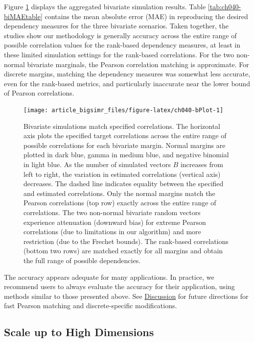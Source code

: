 \documentclass[]{article}
\begin{document}
Figure \ref{fig:ch040-bPlot} displays the aggregated bivariate simulation results.
Table \ref{tab:ch040-biMAEtable} contains the mean absolute error (MAE) in reproducing the desired dependency measures for the three bivariate scenarios.
Taken together, the studies show our methodology is generally accuracy across the entire range of possible correlation values for the rank-based dependency measures, at least in these limited simulation settings for the rank-based correlations.
For the two non-normal bivariate marginals, the Pearson correlation matching is approximate.
For discrete margins, matching the dependency measures was somewhat less accurate, even for the rank-based metrics, and particularly inaccurate near the lower bound of Pearson correlations.

\begin{figure}

{\centering \texttt{[image: article\_bigsimr\_files/figure-latex/ch040-bPlot-1]} 

}

\caption{Bivariate simulations match specified correlations. The horizontal axis plots the specified target correlations across the entire range of possible correlations for each bivariate margin. Normal margins are plotted in dark blue, gamma in medium blue, and negative binomial in light blue. As the number of simulated vectors $B$ increases from left to right, the variation in estimated correlations (vertical axis) decreases. The dashed line indicates equality between the specified and estimated correlations. Only the normal margins match the Pearson correlations (top row) exactly across the entire range of correlations. The two non-normal bivariate random vectors experience attenuation (downward bias) for extreme Pearson correlations (due to limitations in our algorithm) and more restriction (due to the Frechet bounds). The rank-based correlations (bottom two rows) are matched exactly for all margins and obtain the full range of possible dependencies.}\label{fig:ch040-bPlot}
\end{figure}

The accuracy appears adequate for many applications.
In practice, we recommend users to always evaluate the accuracy for their application, using methods similar to those presented above.
See \href{discussion}{Discussion} for future directions for fast Pearson matching and discrete-specific modifications.

\hypertarget{scale-up-to-high-dimensions}{%
\subsection{Scale up to High Dimensions}\label{scale-up-to-high-dimensions}}
\end{document}
